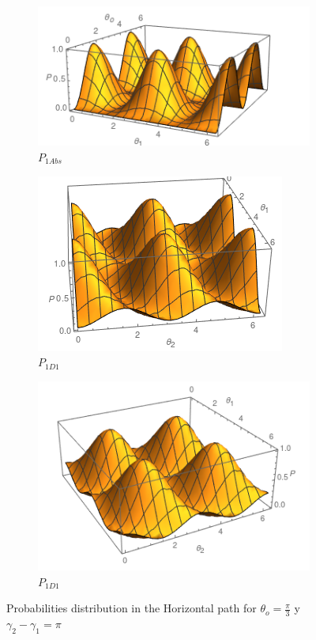 \documentclass[11pt]{article}
\begin{document}
\begin{figure}[h!]
\centering
\begin{subfigure}[b]{0.45\linewidth}
\includegraphics[width=\linewidth]{P11abs.png}
\caption{$P_{1Abs}$}
\label{fig:BS1}
\end{subfigure}
\begin{subfigure}[b]{0.45\linewidth}
\includegraphics[width=\linewidth]{P11d1.png}
\caption{$P_{1D1}$}
\label{fig:westminster_aerea}
\end{subfigure}
\begin{subfigure}[b]{0.45\linewidth}
\includegraphics[width=\linewidth]{P11d2.png}
\caption{$P_{1D1}$}
\label{fig:BS1}
\end{subfigure}
\caption{Probabilities distribution in the Horizontal path for $\theta_{o}=\frac{\pi}{3}$ y $\gamma_{2}-\gamma_{1}=\pi$}
\label{fig:westminster}
\end{figure} 
\end{document}

